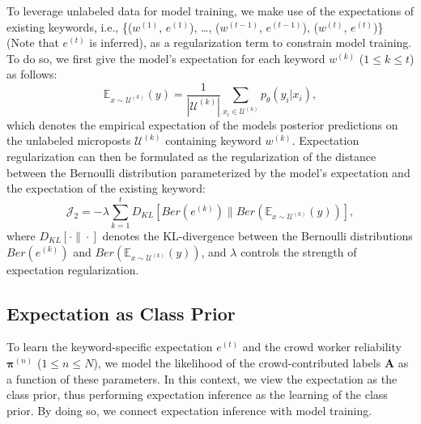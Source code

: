 \documentclass[letterpaper]{article}
\begin{document}
To leverage unlabeled data for model training, we  make use of the expectations of existing keywords, i.e., \{($w^{(1)}$, $e^{(1)}$), \ldots, ($w^{(t-1)}$, $e^{(t-1)}$), ($w^{(t)}$, $e^{(t)}$)\} (Note that $e^{(t)}$ is inferred), as a regularization term to constrain model training. To do so, we first give the model's expectation for each keyword $w^{(k)}$ ($1\leq k\leq t$) as follows:
\begin{equation}
   \mathbb{E}_{x\sim \mathcal{U}^{(k)}}(y) =  \frac{1}{|\mathcal{U}^{(k)}|} \sum_{x_i\in \mathcal{U}^{(k)}} p_\theta(y_i|x_i),
\end{equation}
which denotes the empirical expectation of the models posterior predictions on the unlabeled microposts $\mathcal{U}^{(k)}$ containing keyword $w^{(k)}$. Expectation regularization can then be formulated as the regularization of the distance between the Bernoulli distribution parameterized by the model's expectation and the expectation of the existing keyword:
\begin{equation}
    \mathcal{J}_2 = - \lambda  \sum_{k=1}^t D_{KL}[Ber(e^{(k)})\|Ber(\mathbb{E}_{x\sim \mathcal{U}^{(k)}}(y))],
\end{equation}
where $D_{KL}[\cdot\|\cdot]$ denotes the KL-divergence between the Bernoulli distributions $Ber(e^{(k)})$ and $Ber(\mathbb{E}_{x\sim \mathcal{U}^{(k)}}(y))$, and $\lambda $ controls the strength of expectation regularization.

\subsection{Expectation as Class Prior}
To learn the keyword-specific expectation $e^{(t)}$ and the crowd worker reliability $\boldsymbol{\pi}^{(n)}$ ($1\leq n\leq N$), we model the likelihood of the crowd-contributed labels $\mathbf{A}$ as a function of these parameters. In this context, we view the expectation as the class prior, thus performing expectation inference as the learning of the class prior. By doing so, we connect expectation inference with model training.
\end{document}
